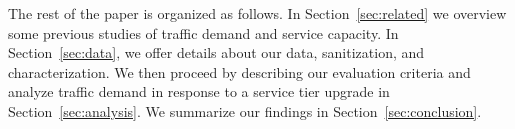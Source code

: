 
The rest of the paper is organized as follows. In Section~\ref{sec:related} we 
overview some previous studies of traffic demand and service capacity. In
Section~\ref{sec:data}, we offer details about our data, sanitization, and 
characterization. We then proceed by describing our evaluation criteria and 
analyze traffic demand in response to a service tier upgrade in 
Section~\ref{sec:analysis}.
We summarize our findings in 
Section~\ref{sec:conclusion}.
